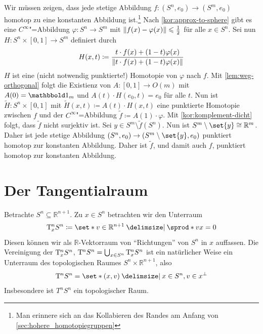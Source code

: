 \begin{beweis}
	Wir müssen zeigen, dass jede stetige Abbildung $f \colon (S^n, e_0) \to (S^m, e_0)$ homotop zu eine konstanten Abbildung ist.\footnote{Man erinnere sich an das Kollabieren des Randes am Anfang von \cref{sec:hohere_homotopiegruppen}} 
	Nach \cref{kor:approx-to-sphere} gibt es eine $C^\infty$"=Abbildung $\varphi \colon S^n \to S^m$ mit $\Vert f(x)- \varphi(x)\Vert \leqslant \frac{1}{2}$ für alle $x \in S^n$. 
	Sei nun $H \colon S^n \times [0,1] \to S^m$ definiert durch
	\[
		H(x,t) \coloneqq \frac{t \cdot f(x)+ (1-t)\varphi(x)}{\Vert t \cdot f(x) + (1-t) \varphi(x)\Vert} 
	\]
	$H$ ist eine (nicht notwendig punktierte!) Homotopie von $\varphi$ nach $f$. 
	Mit \cref{lem:weg-orthogonal} folgt die Existienz von $A \colon [0,1] \to O(m)$ mit $A(0)= \ind_m$ und
	$A(t) \cdot H(e_0,t) = e_0$ für alle $t$. 
	Nun ist $\tilde{H} \colon S^n \times [0,1]$ mit $\tilde{H}(x,t) \coloneqq A(t) \cdot H(x,t)$ eine punktierte Homotopie zwischen $f$ und der $C^\infty$"=Abbildung $\tilde{f} \coloneqq A(1) \cdot \varphi$. 
	Mit \cref{kor:komplement-dicht} folgt, dass $\tilde{f}$ nicht surjektiv ist. 
	Sei $y \in S^m \setminus \tilde{f}(S^n)$. 
	Nun ist $S^m \setminus \set{y} \cong \mathbb{R}^m$. 
	Daher ist jede stetige Abbildung $(S^n, e_0) \to (S^m \setminus \set{y} ,e_0)$ punktiert homotop zur konstanten Abbildung. Daher ist $\tilde{f}$, und damit auch $f$, punktiert homotop zur konstanten Abbildung.
\end{beweis}

\newpage
\section{Der Tangentialraum} %
\label{sec:der_tangentialraum}

\begin{beispiel}[{name=[Tagentialraum der Sphäre]}]
	Betrachte $S^n \subseteq \mathbb{R}^{n+1}$. 
	Zu $x \in S^n$ betrachten wir den Unterraum 
	\[
		\Tang_x^n S^n \coloneqq \set*{v \in \mathbb{R}^{n+1} \given \sprod*{v}{x}=0} 
	\]
	Diesen können wir als $\mathbb{R}$-Vektorraum von \enquote{Richtungen} von $S^n$ in $x$ auffassen. 
	Die Vereinigung der $\mathrm{T}\mkern-0.85mu^n_x S^n$, $\mathrm{T}\mkern-0.85mu^n S^n = \bigcup_{x \in S^n}\mathrm{T}\mkern-0.85mu_x^n S^n$ ist ein natürlicher Weise ein Unterraum des topologischen Raumes $S^n \times \mathbb{R}^{n+1}$, also
	\[
		\Tang^n S^n = \set*{(x,v) \given x \in S^n, v \in x^\bot} 
	\]
	Insbesondere ist $T^n S^n$ ein topologischer Raum.
\end{beispiel}

